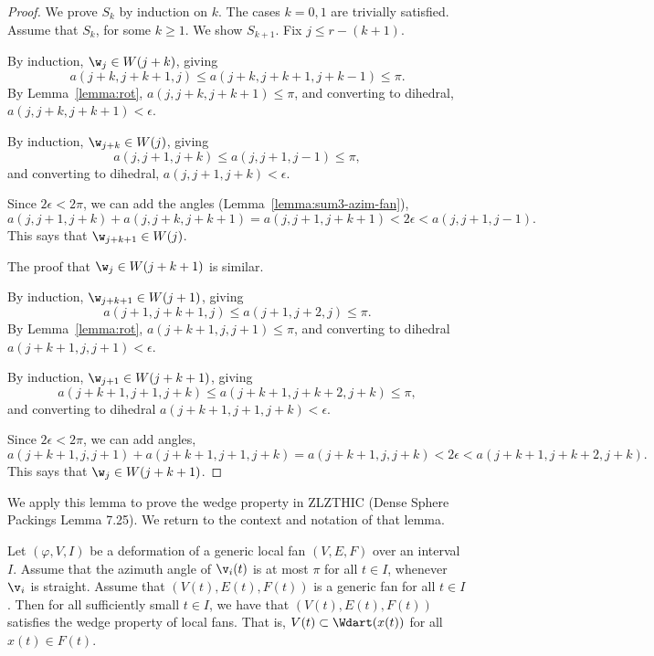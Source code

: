 \begin{proof} We prove $S_k$ by induction on $k$.  The cases $k=0,1$ are trivially satisfied.
Assume that $S_k$, for some $k\ge1$.  We show $S_{k+1}$.  Fix $j\le r-(k+1)$.

By induction, $\w_j\in W({j+k})$, giving
\[
a(j+k,j+k+1,j)\le a(j+k,j+k+1,j+k-1)\le\pi.
\]
By Lemma~\ref{lemma:rot}, $a(j,j+k,j+k+1)\le\pi$, and converting to dihedral, $a(j,j+k,j+k+1)< \epsilon$.

By induction, $\w_{j+k}\in W(j)$, giving
\[
a(j,j+1,j+k)\le a(j,j+1,j-1)\le \pi,
\]
and converting to dihedral, $a(j,j+1,j+k)<\epsilon$.

Since $2\epsilon < 2\pi$, we can add the angles (Lemma~\ref{lemma:sum3-azim-fan}),
\[
a(j,j+1,j+k) + a(j,j+k,j+k+1) = a(j,j+1,j+k+1) < 2\epsilon < a(j,j+1,j-1).
\]
This says that $\w_{j+k+1}\in W(j)$.

The proof that $\w_j\in W({j+k+1})$ is similar.

By induction, $\w_{j+k+1}\in W({j+1})$, giving
\[
a(j+1,j+k+1,j)\le a(j+1,j+2,j)\le \pi.
\]
By Lemma~\ref{lemma:rot}, $a(j+k+1,j,j+1)\le \pi$, and converting to dihedral $a(j+k+1,j,j+1)<\epsilon$.

By induction, $\w_{j+1}\in W({j+k+1})$, giving
\[
a(j+k+1,j+1,j+k)\le a (j+k+1,j+k+2,j+k)\le \pi,
\]
and converting to dihedral $a(j+k+1,j+1,j+k) < \epsilon$.

Since $2\epsilon < 2\pi$, we can add angles,
\[
a(j+k+1,j,j+1) + a(j+k+1,j+1,j+k) = a(j+k+1,j,j+k) < 2 \epsilon < a(j+k+1,j+k+2,j+k).
\]
This says that $\w_{j}\in W({j+k+1})$.
\end{proof}

We apply this lemma to prove the wedge property in ZLZTHIC (Dense Sphere Packings Lemma 7.25).
We return to the context and notation of that lemma.

\begin{corollary}  Let $(\varphi,V,I)$ be a deformation of a generic local fan $(V,E,F)$ over an
interval $I$.  Assume that the azimuth angle of $\v_i(t)$ is at most $\pi$ for all  $t\in I$,
whenever $\v_i$ is straight.  Assume that $(V(t),E(t),F(t))$ is a generic fan for all $t\in I$.
Then for all sufficiently small $t\in I$,  we have that $(V(t),E(t),F(t))$ satisfies the wedge property
of local fans.  That is, $V(t)\subset \Wdart(x(t))$ for all $x(t)\in F(t)$.
\end{corollary}


